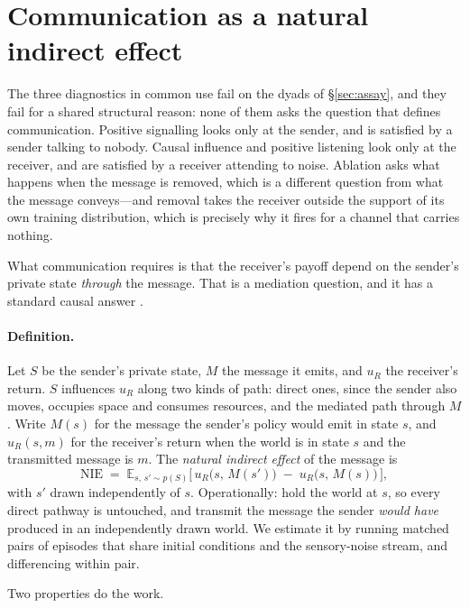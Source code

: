 \section{Communication as a natural indirect effect}
\label{sec:nie}

The three diagnostics in common use fail on the dyads of \S\ref{sec:assay}, and
they fail for a shared structural reason: none of them asks the question that
defines communication. Positive signalling looks only at the sender, and is
satisfied by a sender talking to nobody. Causal influence and positive listening
look only at the receiver, and are satisfied by a receiver attending to noise.
Ablation asks what happens when the message is removed, which is a different
question from what the message conveys---and removal takes the receiver outside
the support of its own training distribution, which is precisely why it fires for
a channel that carries nothing.

What communication requires is that the receiver's payoff depend on the sender's
private state \emph{through} the message. That is a mediation question, and it
has a standard causal answer \citep{pearl2016causal,pearl2009causality}.

\paragraph{Definition.} Let $S$ be the sender's private state, $M$ the message it
emits, and $u_R$ the receiver's return. $S$ influences $u_R$ along two kinds of
path: direct ones, since the sender also moves, occupies space and consumes
resources, and the mediated path through $M$. Write $M(s)$ for the message the
sender's policy would emit in state $s$, and $u_R(s, m)$ for the receiver's return
when the world is in state $s$ and the transmitted message is $m$. The
\emph{natural indirect effect} of the message is
\begin{equation}
\mathrm{NIE} \;=\; \mathbb{E}_{s,\,s' \sim p(S)}\big[\, u_R\big(s,\, M(s')\big)
  \;-\; u_R\big(s,\, M(s)\big) \,\big],
\label{eq:nie}
\end{equation}
with $s'$ drawn independently of $s$. Operationally: hold the world at $s$, so
every direct pathway is untouched, and transmit the message the sender
\emph{would have} produced in an independently drawn world. We estimate it by
running matched pairs of episodes that share initial conditions and the
sensory-noise stream, and differencing within pair.

Two properties do the work.


